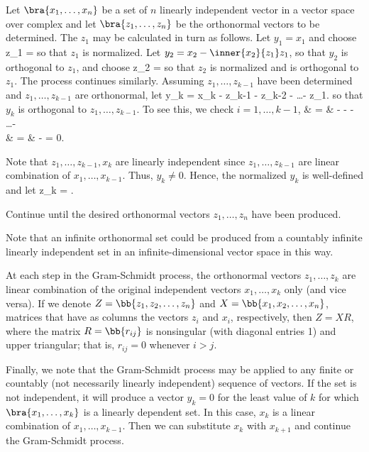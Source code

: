 \begin{algorithm}\label{alg:gram_schmidt_orthonormalization}
Let $\bra{x_1,\dots,x_n}$ be a set of $n$ linearly independent vector in a vector space over complex and let $\bra{z_1,\dots,z_n}$ be the orthonormal vectors to be determined. The $z_1$ may be
calculated in turn as follows. Let $y_1 = x_1$ and choose
\be
z_1 = 
\ee
so that $z_1$ is normalized. Let $y_2 = x_2 - \inner{x_2}{z_1}z_1$, so that $y_2$ is orthogonal to $z_1$, and choose
\be
z_2 = 
\ee
so that $z_2$ is normalized and is orthogonal to $z_1$. %
The process continues similarly. Assuming $z_1,\dots,z_{k-1}$ have been determined and $z_1,\dots,z_{k-1}$ are orthonormal, let
\be
y_k = x_k - z_{k-1} - z_{k-2} - \dots - z_{1}.
\ee
so that $y_k$ is orthogonal to $z_1,\dots,z_{k-1}$. To see this, we check $i = 1,\dots,k-1$,
\beast
{} & = &  -  -  - \dots -  \\
& = &  -  = 0.
\eeast

Note that $z_1,\dots,z_{k-1},x_k$ are linearly independent since $z_1,\dots,z_{k-1}$ are linear combination of $x_1,\dots,x_{k-1}$. Thus, $y_k
\neq 0$. Hence, the normalized $y_k$ is well-defined and let
\be
z_k = .
\ee

Continue until the desired orthonormal vectors $z_1,\dots,z_n$ have been produced.

Note that an infinite orthonormal set could be produced from a countably infinite linearly independent set in an infinite-dimensional vector space in this way.
\end{algorithm}

\begin{remark}
At each step in the Gram-Schmidt process, the orthonormal vectors $z_1,\dots,z_k$ are linear combination of the original independent vectors $x_1,\dots,x_k$ only (and vice versa). If we denote $Z =
\bb{z_1,z_2,\dots,z_n}$ and $X = \bb{x_1,x_2,\dots,x_n}$, matrices that have as columns the vectors $z_i$ and $x_i$, respectively, then $Z = XR$, where the matrix $R = \bb{r_{ij}}$ is nonsingular
(with diagonal entries 1) and upper triangular; that is, $r_{ij} = 0$ whenever $i>j$.

Finally, we note that the Gram-Schmidt process may be applied to any finite or countably (not necessarily linearly independent) sequence of vectors. If the set is not independent, it will produce a
vector $y_k =0$ for the least value of $k$ for which $\bra{x_1,\dots,x_k}$ is a linearly dependent set. In this case, $x_k$ is a linear combination of $x_1,\dots,x_{k-1}$. Then we can substitute
$x_k$ with $x_{k+1}$ and continue the Gram-Schmidt process.
\end{remark}


